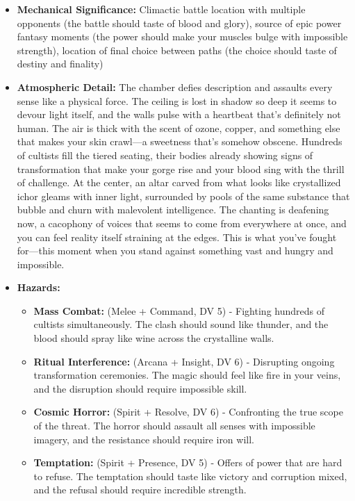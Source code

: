\documentclass[11pt]{article}
\begin{document}
\begin{enumerate}
\begin{itemize}
  \item \textbf{Mechanical Significance:} Climactic battle location with multiple opponents (the battle should taste of blood and glory), source of epic power fantasy moments (the power should make your muscles bulge with impossible strength), location of final choice between paths (the choice should taste of destiny and finality)
  \item \textbf{Atmospheric Detail:} The chamber defies description and assaults every sense like a physical force. The ceiling is lost in shadow so deep it seems to devour light itself, and the walls pulse with a heartbeat that's definitely not human. The air is thick with the scent of ozone, copper, and something else that makes your skin crawl—a sweetness that's somehow obscene. Hundreds of cultists fill the tiered seating, their bodies already showing signs of transformation that make your gorge rise and your blood sing with the thrill of challenge. At the center, an altar carved from what looks like crystallized ichor gleams with inner light, surrounded by pools of the same substance that bubble and churn with malevolent intelligence. The chanting is deafening now, a cacophony of voices that seems to come from everywhere at once, and you can feel reality itself straining at the edges. This is what you've fought for—this moment when you stand against something vast and hungry and impossible.
  \item \textbf{Hazards:}
    \begin{itemize}
    \item \textbf{Mass Combat:} (Melee + Command, DV 5) - Fighting hundreds of cultists simultaneously. The clash should sound like thunder, and the blood should spray like wine across the crystalline walls.
    \item \textbf{Ritual Interference:} (Arcana + Insight, DV 6) - Disrupting ongoing transformation ceremonies. The magic should feel like fire in your veins, and the disruption should require impossible skill.
    \item \textbf{Cosmic Horror:} (Spirit + Resolve, DV 6) - Confronting the true scope of the threat. The horror should assault all senses with impossible imagery, and the resistance should require iron will.
    \item \textbf{Temptation:} (Spirit + Presence, DV 5) - Offers of power that are hard to refuse. The temptation should taste like victory and corruption mixed, and the refusal should require incredible strength.
    \end{itemize}
  \end{itemize}
\end{enumerate}
\end{document}
